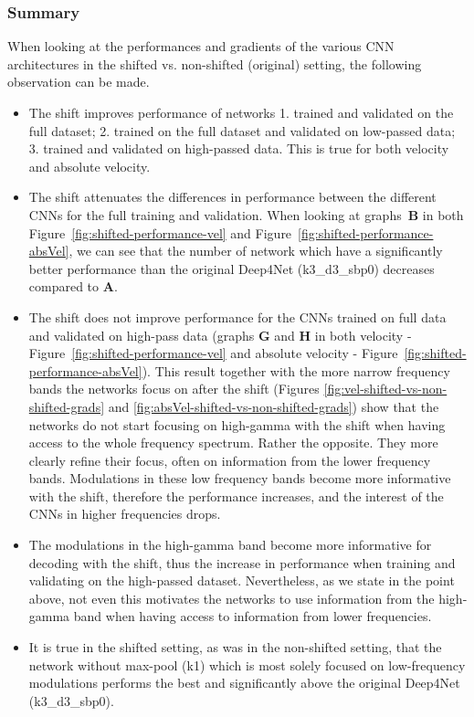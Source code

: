\subsubsection{Summary}\label{subsubsec:centre-shiftig-summary}
When looking at the performances and gradients of the various CNN architectures in the shifted vs. non-shifted (original) setting, the following observation can be made.
\begin{itemize}
    \item The shift improves performance of networks 1. trained and validated on the full dataset; 2. trained on the full dataset and validated on low-passed data;
    3. trained and validated on high-passed data. This is true for both velocity and absolute velocity.
    
    \item The shift attenuates the differences in performance between the different CNNs for the full training and validation.
    When looking at graphs~\textbf{B} in both Figure~\ref{fig:shifted-performance-vel} and Figure~\ref{fig:shifted-performance-absVel}, we can see that the number of network which have a significantly better performance than the original Deep4Net (k3\_d3\_sbp0) decreases compared to \textbf{A}.
    
    \item The shift does not improve performance for the CNNs trained on full data and validated on high-pass data (graphs \textbf{G} and \textbf{H} in both velocity - Figure~\ref{fig:shifted-performance-vel} and absolute velocity - Figure~\ref{fig:shifted-performance-absVel}).
    This result together with the more narrow frequency bands the networks focus on after the shift (Figures \ref{fig:vel-shifted-vs-non-shifted-grads} and \ref{fig:absVel-shifted-vs-non-shifted-grads}) show that the networks do not start focusing on high-gamma with the shift when having access to the whole frequency spectrum.
    Rather the opposite.
    They more clearly refine their focus, often on information from the lower frequency bands.
    Modulations in these low frequency bands become more informative with the shift, therefore the performance increases, and the interest of the CNNs in higher frequencies drops.
    
    \item The modulations in the high-gamma band become more informative for decoding with the shift, thus the increase in performance when training and validating on the high-passed dataset.
    Nevertheless, as we state in the point above, not even this motivates the networks to use information from the high-gamma band when having access to information from lower frequencies.
    
    \item It is true in the shifted setting, as was in the non-shifted setting, that the network without max-pool (k1) which is most solely focused on low-frequency modulations performs the best and significantly above the original Deep4Net (k3\_d3\_sbp0).
    
   
\end{itemize}

